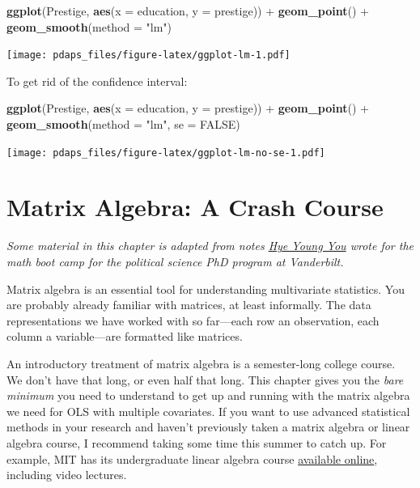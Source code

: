 \documentclass[12pt,oneside,openany]{book}
\newenvironment{Shaded}{\begin{snugshade}}{\end{snugshade}}
\newcommand{\KeywordTok}[1]{\textcolor[rgb]{0.13,0.29,0.53}{\textbf{{#1}}}}
\newcommand{\DataTypeTok}[1]{\textcolor[rgb]{0.13,0.29,0.53}{{#1}}}
\newcommand{\StringTok}[1]{\textcolor[rgb]{0.31,0.60,0.02}{{#1}}}
\newcommand{\OtherTok}[1]{\textcolor[rgb]{0.56,0.35,0.01}{{#1}}}
\newcommand{\NormalTok}[1]{{#1}}
\begin{document}
\begin{Shaded}
\begin{Highlighting}[]
\KeywordTok{ggplot}\NormalTok{(Prestige, }\KeywordTok{aes}\NormalTok{(}\DataTypeTok{x =} \NormalTok{education, }\DataTypeTok{y =} \NormalTok{prestige)) +}
\StringTok{  }\KeywordTok{geom_point}\NormalTok{() +}
\StringTok{  }\KeywordTok{geom_smooth}\NormalTok{(}\DataTypeTok{method =} \StringTok{"lm"}\NormalTok{)}
\end{Highlighting}
\end{Shaded}

\texttt{[image: pdaps\_files/figure-latex/ggplot-lm-1.pdf]}

To get rid of the confidence interval:

\begin{Shaded}
\begin{Highlighting}[]
\KeywordTok{ggplot}\NormalTok{(Prestige, }\KeywordTok{aes}\NormalTok{(}\DataTypeTok{x =} \NormalTok{education, }\DataTypeTok{y =} \NormalTok{prestige)) +}
\StringTok{  }\KeywordTok{geom_point}\NormalTok{() +}
\StringTok{  }\KeywordTok{geom_smooth}\NormalTok{(}\DataTypeTok{method =} \StringTok{"lm"}\NormalTok{, }\DataTypeTok{se =} \OtherTok{FALSE}\NormalTok{)}
\end{Highlighting}
\end{Shaded}

\texttt{[image: pdaps\_files/figure-latex/ggplot-lm-no-se-1.pdf]}

\chapter{Matrix Algebra: A Crash Course}\label{matrix}

\emph{Some material in this chapter is adapted from notes
\href{https://hyeyoungyou.com}{Hye Young You} wrote for the math boot
camp for the political science PhD program at Vanderbilt.}

Matrix algebra is an essential tool for understanding multivariate
statistics. You are probably already familiar with matrices, at least
informally. The data representations we have worked with so far---each
row an observation, each column a variable---are formatted like
matrices.

An introductory treatment of matrix algebra is a semester-long college
course. We don't have that long, or even half that long. This chapter
gives you the \emph{bare minimum} you need to understand to get up and
running with the matrix algebra we need for OLS with multiple
covariates. If you want to use advanced statistical methods in your
research and haven't previously taken a matrix algebra or linear algebra
course, I recommend taking some time this summer to catch up. For
example, MIT has its undergraduate linear algebra course
\href{https://ocw.mit.edu/courses/mathematics/18-06-linear-algebra-spring-2010/index.htm}{available
online}, including video lectures.
\end{document}
